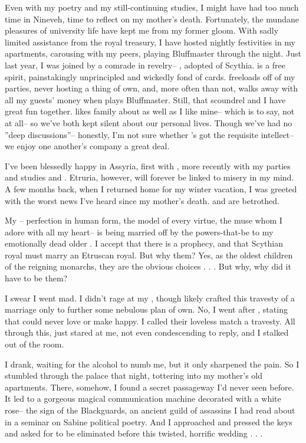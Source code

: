 \documentclass[char]{Kos}
\begin{document}
Even with my poetry and my still-continuing studies, I might have had too much time in Nineveh, time to reflect on my mother's death. Fortunately, the mundane pleasures of university life have kept me from my former gloom. With sadly limited assistance from the royal treasury, I have hosted nightly festivities in my apartments, carousing with my peers, playing Bluffmaster through the night. Just last year, I was joined by a comrade in revelry-- \cWard{}, adopted \cWard{\prince} of Scythia. \cWard{} is a free spirit, painstakingly unprincipled and wickedly fond of cards. \cWard{\They} freeloads off of my parties, never hosting a thing of \cWard{\their} own, and, more often than not, \cWard{\they} walks away with all my guests' money when \cWard{\they} plays Bluffmaster. Still, that scoundrel and I have great fun together. \cWard{} likes \cWard{\their} family about as well as I like mine-- which is to say, not at all-- so we've both kept silent about our personal lives. Though we've had no ''deep discussions''-- honestly, I'm not sure whether \cWard{\they}'s got the requisite intellect-- we enjoy one another's company a great deal.

I've been blessedly happy in Assyria, first with \cBride{}, more recently with my parties and studies and \cWard{}. Etruria, however, will forever be linked to misery in my mind. A few months back, when I returned home for my winter vacation, I was greeted with the worst news I've heard since my mother's death. \cBride{} and \cGroom{} are betrothed.

My \cBride{}-- perfection in human form, the model of every virtue, the muse whom I adore with all my heart-- is being married off by the powers-that-be to my emotionally dead older \cGroom{\sibling}. I accept that there is a prophecy, and that Scythian royal must marry an Etruscan royal. But why them? Yes, as the oldest children of the reigning monarchs, they are the obvious choices . . . But why, why did it have to be them? 

I swear I went mad. I didn't rage at my \cEtruriaKing{\parent}, though \cEtruriaKing{\they} likely crafted this travesty of a marriage only to further some nebulous plan of \cEtruriaKing{\their} own. No, I went after \cGroom{}, stating that \cGroom{\they} could never love \cBride{} or make \cBride{\them} happy. I called their loveless match a travesty. All through this, \cGroom{\they} just stared at me, not even condescending to reply, and I stalked out of the room.

I drank, waiting for the alcohol to numb me, but it only sharpened the pain. So I stumbled through the palace that night, tottering into my mother's old apartments. There, somehow, I found a secret passageway I'd never seen before. It led to a gorgeous magical communication machine decorated with a white rose-- the sign of the Blackguards, an ancient guild of assassins I had read about in a seminar on Sabine political poetry. And I approached and pressed the keys and asked for \cGroom{} to be eliminated before this twisted, horrific wedding . . .
\end{document}
